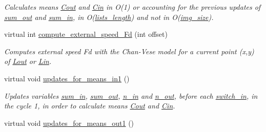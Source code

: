 \begin{DoxyCompactItemize}
\begin{DoxyCompactList}\small\item\em Calculates means \hyperlink{classofeli_1_1_a_cwithout_edges_a02c32b73dcc676251330a42b6fb4e6f4}{Cout} and \hyperlink{classofeli_1_1_a_cwithout_edges_af26f696be73588b2a150c3eef6f62c85}{Cin} in {\itshape O(1)} or accounting for the previous updates of \hyperlink{classofeli_1_1_a_cwithout_edges_a799b4078bc22cbde48cc29c93727efc5}{sum\-\_\-out} and \hyperlink{classofeli_1_1_a_cwithout_edges_a14f61eabccbac71bf616674e8feb44f5}{sum\-\_\-in}, in {\itshape O}(\hyperlink{classofeli_1_1_active_contour_aefe0738d8a43f3981d591a0cc78ed717}{lists\-\_\-length}) and not in {\itshape O}(\hyperlink{classofeli_1_1_active_contour_a9182e11132f64d7607fbd19a78f58387}{img\-\_\-size}). \end{DoxyCompactList}\item 
virtual int \hyperlink{classofeli_1_1_a_cwithout_edges_a4190840f934080ff6eb64fa48c993f98}{compute\-\_\-external\-\_\-speed\-\_\-\-Fd} (int offset)
\begin{DoxyCompactList}\small\item\em Computes external speed {\itshape Fd} with the Chan-\/\-Vese model for a current point {\itshape }(x,y) of \hyperlink{classofeli_1_1_active_contour_a31e0eb18a7ea6ae90acf66ed018fcd85}{Lout} or \hyperlink{classofeli_1_1_active_contour_a7662d4f5c8b87d3e642b08b7e341bd79}{Lin}. \end{DoxyCompactList}\item 
\hypertarget{classofeli_1_1_a_cwithout_edges_a4adb3d3d67dfd3bf9b62aa4e737f128c}{virtual void \hyperlink{classofeli_1_1_a_cwithout_edges_a4adb3d3d67dfd3bf9b62aa4e737f128c}{updates\-\_\-for\-\_\-means\-\_\-in1} ()}\label{classofeli_1_1_a_cwithout_edges_a4adb3d3d67dfd3bf9b62aa4e737f128c}

\begin{DoxyCompactList}\small\item\em Updates variables \hyperlink{classofeli_1_1_a_cwithout_edges_a14f61eabccbac71bf616674e8feb44f5}{sum\-\_\-in}, \hyperlink{classofeli_1_1_a_cwithout_edges_a799b4078bc22cbde48cc29c93727efc5}{sum\-\_\-out}, \hyperlink{classofeli_1_1_a_cwithout_edges_a8d2c28710176ae9b562b4001f8171348}{n\-\_\-in} and \hyperlink{classofeli_1_1_a_cwithout_edges_a07818e5c3700b0164037e982077de10c}{n\-\_\-out}, before each \hyperlink{classofeli_1_1_active_contour_a7d9a557b580af708155ff4ab8bbfd73b}{switch\-\_\-in}, in the cycle 1, in order to calculate means \hyperlink{classofeli_1_1_a_cwithout_edges_a02c32b73dcc676251330a42b6fb4e6f4}{Cout} and \hyperlink{classofeli_1_1_a_cwithout_edges_af26f696be73588b2a150c3eef6f62c85}{Cin}. \end{DoxyCompactList}\item 
\hypertarget{classofeli_1_1_a_cwithout_edges_a2d205edb71c6424fb8532fd5ddbed787}{virtual void \hyperlink{classofeli_1_1_a_cwithout_edges_a2d205edb71c6424fb8532fd5ddbed787}{updates\-\_\-for\-\_\-means\-\_\-out1} ()}\label{classofeli_1_1_a_cwithout_edges_a2d205edb71c6424fb8532fd5ddbed787}


\end{DoxyCompactItemize}
